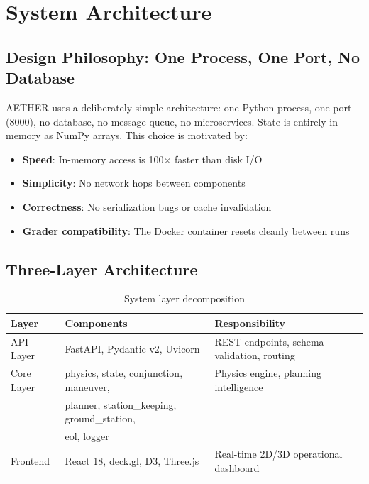 \documentclass[12pt,a4paper]{article}
\begin{document}
\section{System Architecture}

\subsection{Design Philosophy: One Process, One Port, No Database}

AETHER uses a deliberately simple architecture: one Python process, one port (8000), no database, no message queue, no microservices. State is entirely in-memory as NumPy arrays. This choice is motivated by:
\begin{itemize}[noitemsep]
  \item \textbf{Speed}: In-memory access is 100$\times$ faster than disk I/O
  \item \textbf{Simplicity}: No network hops between components
  \item \textbf{Correctness}: No serialization bugs or cache invalidation
  \item \textbf{Grader compatibility}: The Docker container resets cleanly between runs
\end{itemize}

\subsection{Three-Layer Architecture}

\begin{table}[H]
\centering
\caption{System layer decomposition}
\begin{tabular}{lll}
\toprule
\textbf{Layer} & \textbf{Components} & \textbf{Responsibility} \\
\midrule
API Layer & FastAPI, Pydantic v2, Uvicorn & REST endpoints, schema validation, routing \\
Core Layer & physics, state, conjunction, maneuver, & Physics engine, planning intelligence \\
           & planner, station\_keeping, ground\_station, & \\
           & eol, logger & \\
Frontend & React 18, deck.gl, D3, Three.js & Real-time 2D/3D operational dashboard \\
\bottomrule
\end{tabular}
\end{table}
\end{document}
